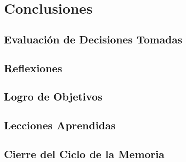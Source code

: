 \chapter{Conclusiones}

\section{Evaluación de Decisiones Tomadas}
	
\section{Reflexiones}

\section{Logro de Objetivos}

\section{Lecciones Aprendidas}

\section{Cierre del Ciclo de la Memoria}